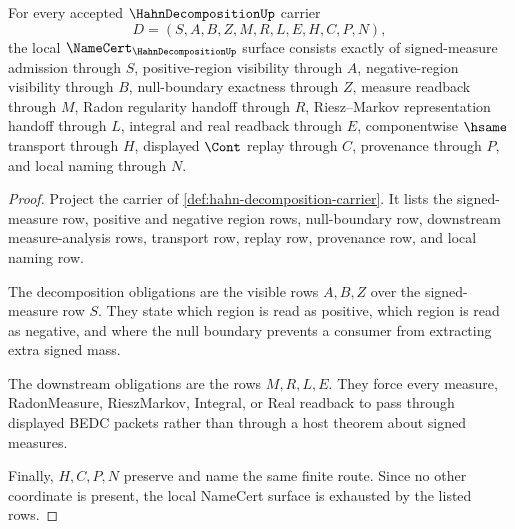 \begin{theorem}
\label{thm:hahn-decomposition-namecert-obligations}
For every accepted $\HahnDecompositionUp$ carrier
$$
D=(S,A,B,Z,M,R,L,E,H,C,P,N),
$$
the local $\NameCert_{\HahnDecompositionUp}$ surface consists exactly of signed-measure admission through $S$, positive-region visibility through $A$, negative-region visibility through $B$, null-boundary exactness through $Z$, measure readback through $M$, Radon regularity handoff through $R$, Riesz--Markov representation handoff through $L$, integral and real readback through $E$, componentwise $\hsame$ transport through $H$, displayed $\Cont$ replay through $C$, provenance through $P$, and local naming through $N$.
\end{theorem}
\begin{proof}
Project the carrier of \autoref{def:hahn-decomposition-carrier}. It lists the signed-measure row, positive and negative region rows, null-boundary row, downstream measure-analysis rows, transport row, replay row, provenance row, and local naming row.

The decomposition obligations are the visible rows $A,B,Z$ over the signed-measure row $S$. They state which region is read as positive, which region is read as negative, and where the null boundary prevents a consumer from extracting extra signed mass.

The downstream obligations are the rows $M,R,L,E$. They force every measure, RadonMeasure, RieszMarkov, Integral, or Real readback to pass through displayed BEDC packets rather than through a host theorem about signed measures.

Finally, $H,C,P,N$ preserve and name the same finite route. Since no other coordinate is present, the local NameCert surface is exhausted by the listed rows.
\end{proof}

